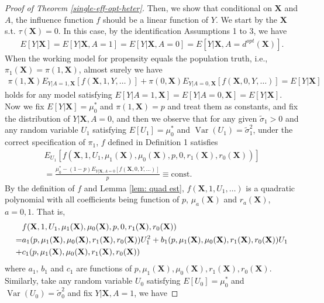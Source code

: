 \documentclass[11pt]{article}
\theoremstyle{referenceplain}
\theoremstyle{referencedefinition}
\theoremstyle{referenceremark}
\begin{document}
\begin{proof}[Proof of Theorem \ref{single-eff-opt-heter}]
    Then, we show that conditional on $\mathbf{X}$ and $A$, the influence function $f$ should be a linear function of $Y$. We start by the $\mathbf{X}$ s.t. $\tau(\mathbf{X}) = 0$. In this case, by the identification Assumptions 1 to 3, we have
    \begin{align}\label{thm3.2_1}
        E[Y|\mathbf{X}] = E[Y|\mathbf{X},A=1] = E[Y|\mathbf{X},A=0] = E[Y|\mathbf{X},A=d^{opt}(\mathbf{X})].
    \end{align}
When the working model for propensity equals the population truth, i.e., $\pi_1(\mathbf{X}) = \pi(1,\mathbf{X})$, almost surely we have
\begin{align}\label{single-unbias-eq-tau=0}
   \pi(1,\mathbf{X})E_{Y|A=1,\mathbf{X}}[ f(\mathbf{X},1,Y,\dots)] + \pi(0,\mathbf{X}) E_{Y|A=0,\mathbf{X}}[ f(\mathbf{X},0,Y,\dots)] = E[Y|\mathbf{X}]
\end{align}
holds for any model satisfying $E[Y|A=1,\mathbf{X}] = E[Y|A=0,\mathbf{X}]=E[Y|\mathbf{X}]$. Now we fix $E[Y|\mathbf{X}]=\mu_0^*$ and $\pi(1,\mathbf{X})=p$ and treat them as constants, and fix the distribution of $Y|\mathbf{X},A=0$, and then we observe that for any given $\widetilde{\sigma}_1>0$ and any random variable $U_1$ satisfying $E[U_1]=\mu_0^*$ and $\operatorname{Var}(U_1)=\widetilde{\sigma}_1^2$, under the correct specification of $\pi_1$, $f$ defined in Definition 1 satisfies
\begin{align*}
    E_{U_1}[f(\mathbf{X},1,U_1,\mu_1(\mathbf{X}),\mu_0(\mathbf{X}),p,0,r_1(\mathbf{X}),r_0(\mathbf{X}))] \\= \frac{\mu_0^*-(1-p)E_{Y|\mathbf{X},A=0}[f(\mathbf{X},0,Y,\dots)]}{p}\equiv \text{const}.
\end{align*}
By the definition of $f$ and Lemma \ref{lem: quad est}, $f(\mathbf{X},1,U_1,\dots)$ is a quadratic polynomial with all coefficients being function of $p$, $\mu_a(\mathbf{X})$ and $r_a(\mathbf{X})$, $a=0,1$. That is, 
\begin{align}\label{quad-single-1}
    &f(\mathbf{X},1,U_1,\mu_1(\mathbf{X}),\mu_0(\mathbf{X}),p,0,r_1(\mathbf{X}),r_0(\mathbf{X}))\notag\\ =& a_1(p,\mu_1(\mathbf{X}),\mu_0(\mathbf{X}),r_1(\mathbf{X}),r_0(\mathbf{X})) U_1^2 + b_1(p,\mu_1(\mathbf{X}),\mu_0(\mathbf{X}),r_1(\mathbf{X}),r_0(\mathbf{X})) U_1 \notag\\+ &c_1(p,\mu_1(\mathbf{X}),\mu_0(\mathbf{X}),r_1(\mathbf{X}),r_0(\mathbf{X}))
\end{align}
where $a_1$, $b_1$ and $c_1$ are functions of $p,\mu_1(\mathbf{X}),\mu_0(\mathbf{X}),r_1(\mathbf{X}),r_0(\mathbf{X})$. Similarly, take any random variable $U_0$ satisfying $E[U_0]=\mu_0^*$ and $\operatorname{Var}(U_0)=\widetilde{\sigma}_0^2$ and fix $Y|\mathbf{X},A=1$, we have

\end{proof}
\end{document}

